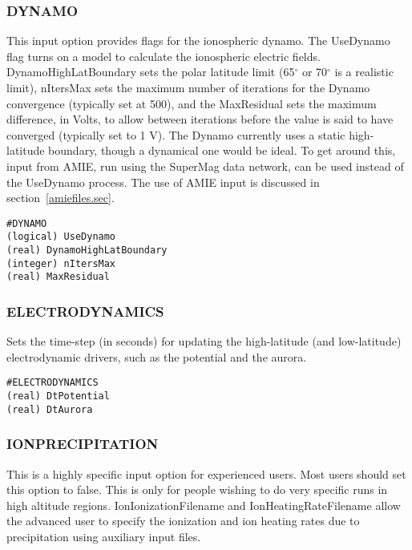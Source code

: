 \subsubsection{DYNAMO}
\label{dynamo.sec}

This input option provides flags for the ionospheric dynamo.  The UseDynamo flag turns on a model to calculate the ionospheric electric fields.  DynamoHighLatBoundary sets the polar latitude limit (65$^\circ$ or 70$^\circ$ is a realistic limit), nItersMax sets the maximum number of iterations for the Dynamo convergence (typically set at 500), and the MaxResidual sets the maximum difference, in Volts, to allow between iterations before the value is said to have converged (typically set to 1 V).  The Dynamo currently uses a static high-latitude boundary, though a dynamical one would be ideal.  To get around this, input from AMIE, run using the SuperMag data network, can be used instead of the UseDynamo process.  The use of AMIE input is discussed in section~\ref{amiefiles.sec}.

\begin{verbatim}
#DYNAMO
(logical) UseDynamo   
(real) DynamoHighLatBoundary 
(integer) nItersMax        
(real) MaxResidual     
\end{verbatim}

\subsubsection{ELECTRODYNAMICS}
\label{electrodynamics.sec}

Sets the time-step (in seconds) for updating the high-latitude (and low-latitude) electrodynamic drivers, such as the potential and the aurora.

\begin{verbatim}
#ELECTRODYNAMICS
(real) DtPotential 
(real) DtAurora  
\end{verbatim}

\subsubsection{IONPRECIPITATION}
\label{ionprecipitation.sec}

This is a highly specific input option for experienced users.  Most users should set this option to false.  This is only for people wishing to do very specific runs in high altitude regions.  IonIonizationFilename and IonHeatingRateFilename allow the advanced user to specify the ionization and ion heating rates due to precipitation using auxiliary input files.

